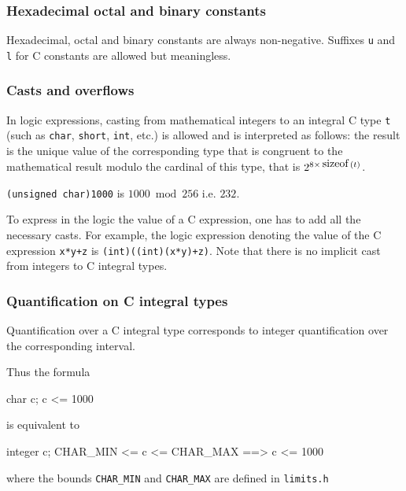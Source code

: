 \subsubsection{Hexadecimal octal and binary constants}

Hexadecimal, octal and binary constants are always non-negative. Suffixes
\texttt{u} and \texttt{l} for C constants are allowed but meaningless.

\subsubsection{Casts and  overflows}

In logic expressions, casting from mathematical integers
to an integral C type \lstinline|t| (such as \lstinline|char|,
\lstinline|short|, \lstinline|int|, etc.) is allowed and is
interpreted as follows: the result is the unique value of the
corresponding type that is congruent to the mathematical result modulo
the cardinal of this type, that is $2^{8\times\sizeof(t)}$.
\begin{example}
  \lstinline|(unsigned char)1000| is $1000 \bmod 256$ i.e. $232$.
\end{example}

To express in the logic the value of a C
expression, one has to add all the necessary casts. For
example, the logic expression denoting the value of the C expression
\lstinline|x*y+z| is \lstinline|(int)((int)(x*y)+z)|.
Note that there is no implicit cast from integers to C integral types.


\subsubsection{Quantification on C integral types}
\label{sec:quantification}

Quantification over a C integral type corresponds to integer
quantification over the corresponding interval.
\begin{example}
Thus the formula
\begin{listing-nonumber}
\forall char c; c <= 1000
\end{listing-nonumber}
is equivalent to
\begin{listing-nonumber}
\forall integer c; CHAR_MIN <= c <= CHAR_MAX ==> c <= 1000
\end{listing-nonumber}
where the bounds \verb|CHAR_MIN| and \verb|CHAR_MAX| are defined
in \verb|limits.h|
\end{example}


